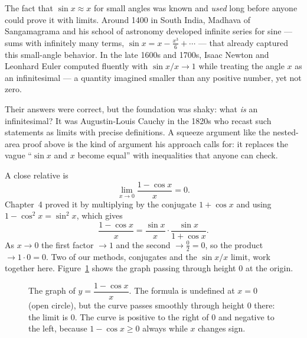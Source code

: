 \begin{historybox}
The fact that $\sin x \approx x$ for small angles was known and \emph{used}
long before anyone could prove it with limits. Around 1400 in South India,
Madhava of Sangamagrama and his school of astronomy developed infinite
series for sine --- sums with infinitely many terms, $\sin x = x - \frac{x^3}{6} + \cdots$ ---
that already captured this small-angle behavior. In the late 1600s and 1700s,
Isaac Newton and Leonhard Euler computed fluently with $\sin x / x \to 1$ while
treating the angle $x$ as an infinitesimal --- a quantity imagined smaller than
any positive number, yet not zero.

Their answers were correct, but the foundation was shaky:
what \emph{is} an infinitesimal? It was Augustin-Louis Cauchy in the 1820s who recast
such statements as limits with precise definitions. A squeeze argument like the
nested-area proof above is the kind of argument his approach calls for: it replaces
the vague ``$\sin x$ and $x$ become equal'' with inequalities that anyone
can check.
\end{historybox}

\begin{example}
\label{ch07:ex-cos}
A close relative is
\[
  \lim_{x\to 0}\frac{1-\cos x}{x} = 0.
\]
Chapter~4 proved it by multiplying by the conjugate $1+\cos x$ and using
$1-\cos^2 x=\sin^2 x$, which gives
\[
  \frac{1-\cos x}{x} = \frac{\sin x}{x}\cdot\frac{\sin x}{1+\cos x}.
\]
As $x\to 0$ the first factor $\to 1$ and the second $\to \frac{0}{2} = 0$, so
the product $\to 1\cdot 0 = 0$. Two of our methods, conjugates and the
$\sin x/x$ limit, work together here. Figure~\ref{ch07:fig-cos} shows the graph
passing through height $0$ at the origin.
\end{example}

\begin{figure}[htbp]
\centering
{}
\caption{The graph of $y=\dfrac{1-\cos x}{x}$. The formula is undefined at
$x=0$ (open circle), but the curve passes smoothly through height $0$ there:
the limit is $0$. The curve is positive to the right of $0$ and negative to the
left, because $1-\cos x\ge 0$ always while $x$ changes sign.}
\label{ch07:fig-cos}
\end{figure}

